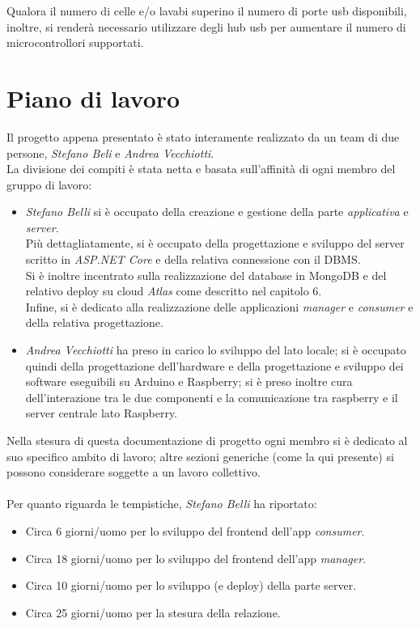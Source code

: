 \documentclass[12pt]{article}
\begin{document}
Qualora il numero di celle e/o lavabi superino il numero di porte usb disponibili, inoltre, si renderà necessario utilizzare degli hub usb per aumentare il numero di microcontrollori supportati.



\newpage
\section{Piano di lavoro}
Il progetto appena presentato è stato interamente realizzato da un team di due persone, \textit{Stefano Beli} e \textit{Andrea Vecchiotti}.\\
La divisione dei compiti è stata netta e basata sull'affinità di ogni membro del gruppo di lavoro:
\begin{itemize}
	\item \textit{Stefano Belli} si è occupato della creazione e gestione della parte \textit{applicativa} e \textit{server}.\\
	Più dettagliatamente, si è occupato della progettazione e sviluppo del server scritto in \textit{ASP.NET Core} e della relativa connessione con il DBMS.\\
	Si è inoltre incentrato sulla realizzazione del database in MongoDB e del relativo deploy su cloud \textit{Atlas} come descritto nel capitolo 6.\\
	Infine, si è dedicato alla realizzazione delle applicazioni \textit{manager} e \textit{consumer} e della relativa progettazione.
	\item \textit{Andrea Vecchiotti} ha preso in carico lo sviluppo del lato locale; si è occupato quindi della progettazione dell'hardware e della progettazione e sviluppo dei software eseguibili su Arduino e Raspberry; si è preso inoltre cura dell'interazione tra le due componenti e la comunicazione tra raspberry e il server centrale lato Raspberry.
\end{itemize}
Nella stesura di questa documentazione di progetto ogni membro si è dedicato al suo specifico ambito di lavoro; altre sezioni generiche (come la qui presente) si possono considerare soggette a un lavoro collettivo.\\\\
Per quanto riguarda le tempistiche, \textit{Stefano Belli}  ha riportato:
\begin{itemize}
\item Circa 6 giorni/uomo per lo sviluppo del frontend dell'app \textit{consumer}.
\item Circa 18 giorni/uomo per lo sviluppo del frontend dell'app \textit{manager}.
\item Circa 10 giorni/uomo per lo sviluppo (e deploy) della parte server.
\item Circa 25 giorni/uomo per la stesura della relazione.
\end{itemize}
\end{document}
